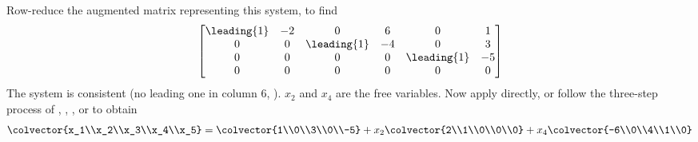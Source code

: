 Row-reduce the augmented matrix representing this system, to find
%
\begin{equation*}
\begin{bmatrix}
\leading{1} & -2 & 0 & 6 & 0 & 1\\ 
0 & 0 & \leading{1} & -4 & 0 & 3\\ 
0 & 0 & 0 & 0 & \leading{1} & -5\\
0 & 0 & 0 & 0 & 0 & 0
\end{bmatrix}
\end{equation*}
%
The system is consistent (no leading one in column 6, ). $x_2$ and $x_4$ are the free variables.  Now apply  directly, or follow the three-step process of , , , or  to obtain
%
\begin{equation*}
\colvector{x_1\\x_2\\x_3\\x_4\\x_5}
=
\colvector{1\\0\\3\\0\\-5}+
x_2\colvector{2\\1\\0\\0\\0}+
x_4\colvector{-6\\0\\4\\1\\0}
\end{equation*}
